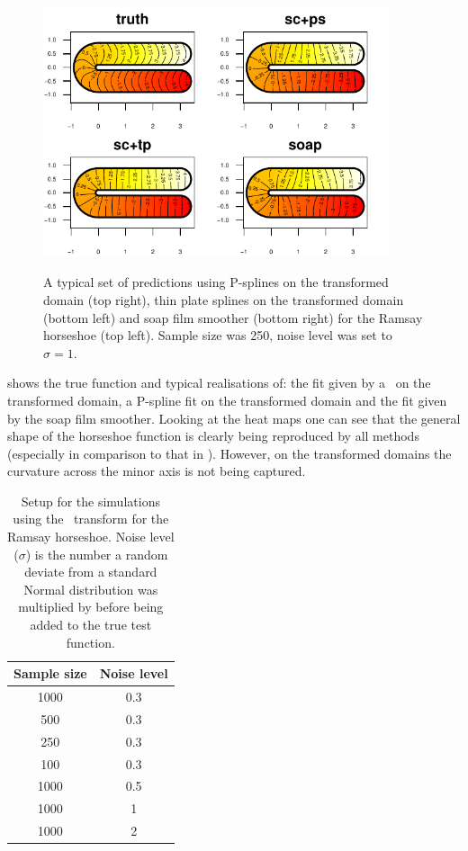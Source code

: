 \begin{figure}
\centering
\includegraphics[width=4in]{sc/figs/compsmooth.pdf} \\
\caption{A typical set of predictions using P-splines on the transformed domain (top right), thin plate splines on the transformed domain (bottom left) and soap film smoother (bottom right) for the Ramsay horseshoe (top left). Sample size was 250, noise level was set to $\sigma=1$.}
\label{compsmooth}
\end{figure}

 shows the true function and typical realisations of: the fit given by a \tprs\ on the transformed domain, a P-spline fit on the transformed domain and the fit given by the soap film smoother. Looking at the heat maps one can see that the general shape of the horseshoe function is clearly being reproduced by all methods (especially in comparison to that in ). However, on the transformed domains the curvature across the minor axis is not being captured.

\begin{table}[tb]
\centering
\begin{tabular}{c c}\\
Sample size & Noise level \\
\hline
\hline
1000 & 0.3 \\
500 & 0.3 \\
250 & 0.3 \\
100 & 0.3 \\
1000 & 0.5 \\
1000 & 1 \\
1000 & 2 \\
\end{tabular}
\caption{Setup for the simulations using the \sch\ transform for the Ramsay horseshoe. Noise level ($\sigma$) is the number a random deviate from a standard Normal distribution was multiplied by before being added to the true test function.}
\label{scramsimtable}
\end{table}

